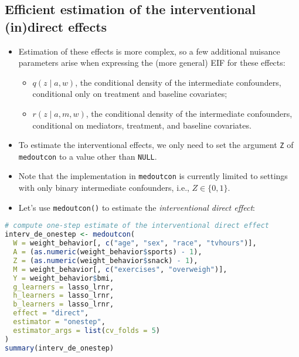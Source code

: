 \documentclass[
  12pt,
]{book}
\newcommand{\passthrough}[1]{#1}
\providecommand{\tightlist}{%
  \setlength{\itemsep}{0pt}\setlength{\parskip}{0pt}}
\theoremstyle{definition}
\theoremstyle{definition}
\theoremstyle{definition}
\newcommand{\1}{\mathbbm{1}}
\begin{document}
\hypertarget{efficient-estimation-of-the-interventional-indirect-effects}{%
\subsection{Efficient estimation of the interventional (in)direct effects}\label{efficient-estimation-of-the-interventional-indirect-effects}}

\begin{itemize}
\tightlist
\item
  Estimation of these effects is more complex, so a few additional nuisance
  parameters arise when expressing the (more general) EIF for these effects:

  \begin{itemize}
  \tightlist
  \item
    \(q(z \mid a, w)\), the conditional density of the intermediate confounders,
    conditional only on treatment and baseline covariates;
  \item
    \(r(z \mid a, m, w)\), the conditional density of the intermediate
    confounders, conditional on mediators, treatment, and baseline covariates.
  \end{itemize}
\item
  To estimate the interventional effects, we only need to set the argument \passthrough{\lstinline!Z!}
  of \passthrough{\lstinline!medoutcon!} to a value other than \passthrough{\lstinline!NULL!}.
\item
  Note that the implementation in \passthrough{\lstinline!medoutcon!} is currently limited to settings
  with only binary intermediate confounders, i.e., \(Z \in \{0, 1\}\).
\item
  Let's use \passthrough{\lstinline!medoutcon()!} to estimate the \emph{interventional direct effect}:
\end{itemize}

\begin{lstlisting}[language=R]
# compute one-step estimate of the interventional direct effect
interv_de_onestep <- medoutcon(
  W = weight_behavior[, c("age", "sex", "race", "tvhours")],
  A = (as.numeric(weight_behavior$sports) - 1),
  Z = (as.numeric(weight_behavior$snack) - 1),
  M = weight_behavior[, c("exercises", "overweigh")],
  Y = weight_behavior$bmi,
  g_learners = lasso_lrnr,
  h_learners = lasso_lrnr,
  b_learners = lasso_lrnr,
  effect = "direct",
  estimator = "onestep",
  estimator_args = list(cv_folds = 5)
)
summary(interv_de_onestep)
\end{lstlisting}
\end{document}
